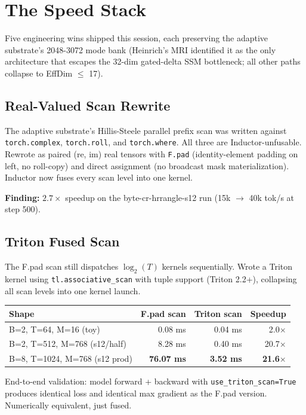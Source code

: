 \documentclass[11pt,a4paper]{report}
\newcommand{\finding}[1]{\textcolor{finding}{\textbf{Finding:}} #1}
\begin{document}
\chapter{The Speed Stack}

Five engineering wins shipped this session, each preserving the adaptive substrate's 2048-3072 mode bank (Heinrich's MRI identified it as the only architecture that escapes the 32-dim gated-delta SSM bottleneck; all other paths collapse to EffDim $\leq$ 17).

\section{Real-Valued Scan Rewrite}

The adaptive substrate's Hillis-Steele parallel prefix scan was written against \texttt{torch.complex}, \texttt{torch.roll}, and \texttt{torch.where}. All three are Inductor-unfusable. Rewrote as paired (re, im) real tensors with \texttt{F.pad} (identity-element padding on left, no roll-copy) and direct assignment (no broadcast mask materialization). Inductor now fuses every scan level into one kernel.

\finding{$2.7\times$ speedup on the byte-cr-hrrangle-s12 run (15k $\to$ 40k tok/s at step 500).}

\section{Triton Fused Scan}

The F.pad scan still dispatches $\log_2(T)$ kernels sequentially. Wrote a Triton kernel using \texttt{tl.associative\_scan} with tuple support (Triton 2.2+), collapsing all scan levels into one kernel launch.

\begin{center}
\begin{tabular}{lrrr}
\toprule
Shape & F.pad scan & Triton scan & Speedup \\
\midrule
B=2, T=64, M=16 (toy) & 0.08 ms & 0.04 ms & 2.0$\times$ \\
B=2, T=512, M=768 (s12/half) & 8.28 ms & 0.40 ms & 20.7$\times$ \\
B=8, T=1024, M=768 (s12 prod) & \textbf{76.07 ms} & \textbf{3.52 ms} & \textbf{21.6$\times$} \\
\bottomrule
\end{tabular}
\end{center}

End-to-end validation: model forward + backward with \texttt{use\_triton\_scan=True} produces identical loss and identical max gradient as the F.pad version. Numerically equivalent, just fused.
\end{document}
